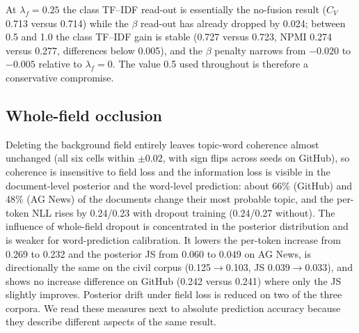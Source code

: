 \documentclass[pdflatex,sn-basic]{sn-jnl}
\begin{document}
At $\lambda_f=0.25$ the class TF--IDF read-out is essentially the no-fusion result ($C_V$ 0.713
versus 0.714) while the $\beta$ read-out has already dropped by 0.024; between 0.5 and 1.0 the
class TF--IDF gain is stable (0.727 versus 0.723, NPMI 0.274 versus 0.277, differences below
0.005), and the $\beta$ penalty narrows from $-0.020$ to $-0.005$ relative to $\lambda_f=0$.
The value 0.5 used throughout is therefore a conservative compromise.

\subsection{Whole-field occlusion}
Deleting the background field entirely leaves topic-word coherence almost unchanged (all six
cells within $\pm0.02$, with sign flips across seeds on GitHub), so coherence is insensitive to
field loss and the information loss is visible in the document-level posterior and the
word-level prediction: about 66\% (GitHub) and 48\% (AG News) of the documents change their most
probable topic, and the per-token NLL rises by 0.24/0.23 with dropout training (0.24/0.27
without). The influence of whole-field dropout is concentrated in the posterior distribution and
is weaker for word-prediction calibration. It lowers the per-token increase from 0.269 to 0.232
and the posterior JS from 0.060 to 0.049 on AG News, is directionally the same on the civil
corpus (0.125$\to$0.103, JS 0.039$\to$0.033), and shows no increase difference on GitHub (0.242
versus 0.241) where only the JS slightly improves. Posterior drift under field loss is reduced
on two of the three corpora. We read these measures next to absolute prediction accuracy
because they describe different aspects of the same result.
\end{document}
